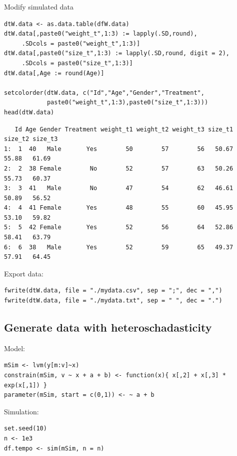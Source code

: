 \documentclass{article}
\begin{document}
Modify simulated data 
\lstset{language=r,label= ,caption= ,captionpos=b,numbers=none}
\begin{lstlisting}
dtW.data <- as.data.table(dfW.data)
dtW.data[,paste0("weight_t",1:3) := lapply(.SD,round),
	 .SDcols = paste0("weight_t",1:3)]
dtW.data[,paste0("size_t",1:3) := lapply(.SD,round, digit = 2),
	 .SDcols = paste0("size_t",1:3)]
dtW.data[,Age := round(Age)]

setcolorder(dtW.data, c("Id","Age","Gender","Treatment",
			paste0("weight_t",1:3),paste0("size_t",1:3)))
head(dtW.data)
\end{lstlisting}

\begin{verbatim}
   Id Age Gender Treatment weight_t1 weight_t2 weight_t3 size_t1 size_t2 size_t3
1:  1  40   Male       Yes        50        57        56   50.67   55.88   61.69
2:  2  38 Female        No        52        57        63   50.26   55.73   60.37
3:  3  41   Male        No        47        54        62   46.61   50.89   56.52
4:  4  41 Female       Yes        48        55        60   45.95   53.10   59.82
5:  5  42 Female       Yes        52        56        64   52.86   58.41   63.79
6:  6  38   Male       Yes        52        59        65   49.37   57.91   64.45
\end{verbatim}

Export data:
\lstset{language=r,label= ,caption= ,captionpos=b,numbers=none}
\begin{lstlisting}
fwrite(dtW.data, file = "./mydata.csv", sep = ";", dec = ",")
fwrite(dtW.data, file = "./mydata.txt", sep = " ", dec = ".")
\end{lstlisting}

\subsection{Generate data with heteroschadasticity}
\label{sec:org8e327ab}

Model:
\lstset{language=r,label= ,caption= ,captionpos=b,numbers=none}
\begin{lstlisting}
mSim <- lvm(y[m:v]~x)
constrain(mSim, v ~ x + a + b) <- function(x){ x[,2] + x[,3] * exp(x[,1]) }
parameter(mSim, start = c(0,1)) <- ~ a + b
\end{lstlisting}

Simulation:
\lstset{language=r,label= ,caption= ,captionpos=b,numbers=none}
\begin{lstlisting}
set.seed(10)
n <- 1e3
df.tempo <- sim(mSim, n = n)
\end{lstlisting}
\end{document}
